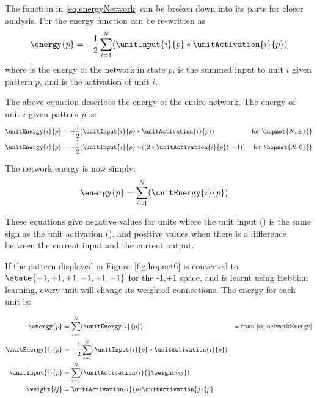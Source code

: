 The  function in \eqref{eq:energyNetwork} can be broken down into its parts for closer analysis.  For  the energy function can be re-written as   
\begin{equation}  
	\displaystyle\energy{p} = -\frac{1}{2} \sum_{i=1}^{N} (\unitInput{i}{p} * \unitActivation{i}{p})  
\end{equation}
where  is the energy of the network in state $p$,  is the summed input to unit $i$ given pattern $p$, and  is the activation of unit $i$.

The above equation describes the energy of the entire network.  The energy  of unit $i$ given pattern $p$ is:
\begin{align}  
	\label{eq:unitEnergy}
	\unitEnergy{i}{p} &= -\frac{1}{2}(\unitInput{i}{p} * \unitActivation{i}{p})   &\mbox{for}\ \hopnet{N,\pm}{} \\
	\unitEnergy{i}{p} &= -\frac{1}{2}(\unitInput{i}{p} * ((2*\unitActivation{i}{p})-1)) &\mbox{for}\ \hopnet{N,0}{}
\end{align}

The network energy is now simply:
\begin{align} 
	\displaystyle\energy{p} &= \sum_{i=1}^{N}(\unitEnergy{i}{p})
	\label{eq:networkEnergy}
\end{align}

These equations give negative values for units where the unit input (\unitInput{}{}) is the same sign as the unit activation (\unitActivation{}{}), and positive values when there is a difference between the current input and the current output.

If the pattern displayed in Figure~\ref{fig:hopnet6} is converted to $\state{-1,+1,+1,-1,+1,-1}$ for the -1,+1 space, and is learnt using Hebbian learning, every unit will change its weighted connections.   The energy for each unit is:

\begin{align*}  
	\energy{p} &= \sum_{i=1}^{N}(\unitEnergy{i}{p})&=\mathrm{from}\ \eqref{eq:networkEnergy}\\
	\unitEnergy{i}{p} &= -\frac{1}{2}\sum_{i=1}^{N} (\unitInput{i}{p} * \unitActivation{i}{p})\\
	\displaystyle\unitInput{i}{p} &= \sum_{i=1}^{N}(\unitActivation{i}{}\weight{ij})\\
	\weight{ij} &= \unitActivation{i}{p}\unitActivation{j}{p}\\
\end{align*}

